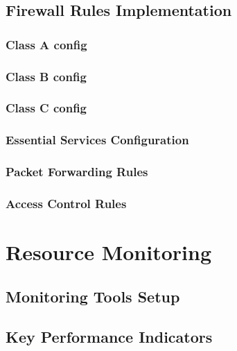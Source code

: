 \subsection{Firewall Rules Implementation}
\label{subsec:firewall-rules}

\subsubsection{Class A config}

\subsubsection{Class B config}

\subsubsection{Class C config}

\subsubsection{Essential Services Configuration}

\subsubsection{Packet Forwarding Rules}

\subsubsection{Access Control Rules}

\section{Resource Monitoring}
\label{sec:resource-monitoring}

\subsection{Monitoring Tools Setup}
\label{subsec:monitoring-tools}

\subsection{Key Performance Indicators}
\label{subsec:kpi}

